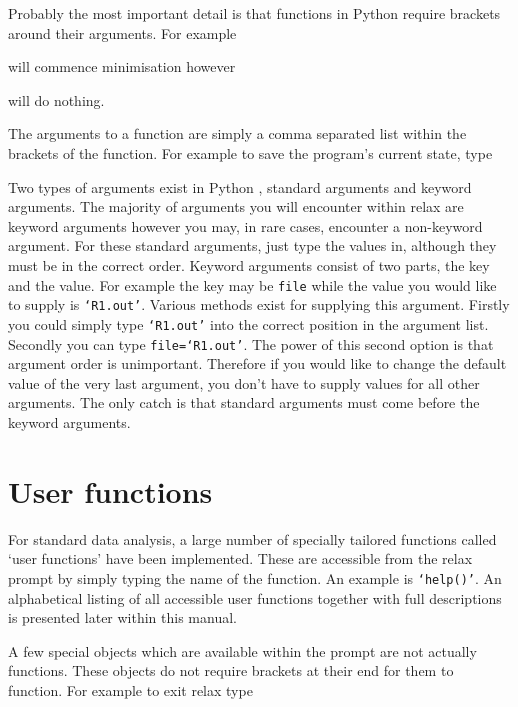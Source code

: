 Probably the most important detail is that functions in Python  require brackets around their arguments.  For example


will commence minimisation  however


will do nothing.

The arguments to a function are simply a comma separated list within the brackets of the function.  For example to save the program's current state, type


Two types of arguments exist in Python , standard arguments and keyword arguments.  The majority of arguments you will encounter within relax are keyword arguments however you may, in rare cases, encounter a non-keyword argument.  For these standard arguments, just type the values in, although they must be in the correct order.  Keyword arguments consist of two parts, the key and the value.  For example the key may be \texttt{file} while the value you would like to supply is \texttt{`R1.out'}.  Various methods exist for supplying this argument.  Firstly you could simply type \texttt{`R1.out'} into the correct position in the argument list.  Secondly you can type \texttt{file=`R1.out'}.  The power of this second option is that argument order is unimportant.  Therefore if you would like to change the default value of the very last argument, you don't have to supply values for all other arguments.  The only catch is that standard arguments must come before the keyword arguments.




\section{User functions}

For standard data analysis, a large number of specially tailored functions called `user functions'  have been implemented.  These are accessible from the relax prompt by simply typing the name of the function.  An example is \texttt{`help()'}.  An alphabetical listing of all accessible user functions  together with full descriptions is presented later within this manual.

A few special objects which are available within the prompt are not actually functions.  These objects do not require brackets at their end for them to function.  For example to exit relax type

